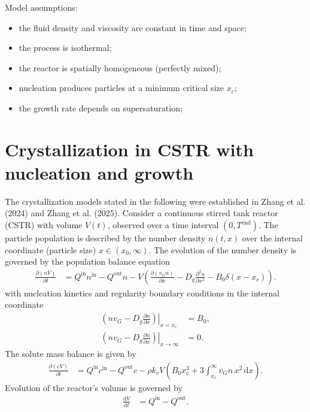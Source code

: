 \documentclass{article}
\begin{document}
Model assumptions:
\begin{itemize}
    \item the fluid density and viscosity are constant in time and space;
    \item the process is isothermal;
    \item the reactor is spatially homogeneous (perfectly mixed);
    \item nucleation produces particles at a minimum critical size $x_{c}$;
    \item the growth rate depends on supersaturation;
\end{itemize}

\section*{Crystallization in CSTR with nucleation and growth}
The crystallization models stated in the following were established in Zhang et al. (2024) and Zhang et al. (2025).
Consider a continuous stirred tank reactor (CSTR) with volume $V(t)$, observed over a time interval $(0, T^{\mathrm{end}})$.
The particle population is described by the number density $n(t, x)$ over the internal coordinate (particle size) $x\in(x_{0}, \infty)$.
The evolution of the number density is governed by the population balance equation
\begin{align}
    \frac{\partial (n V)}{\partial t}
    &= Q^{\mathrm{in}} n^{\mathrm{in}}
        - Q^{\mathrm{out}} n
        - V \left( \frac{\partial (v_{G} n)}{\partial x} - D_{g} \frac{\partial^{2} n}{\partial x^{2}} - B_{0} \delta(x - x_{c}) \right).
\end{align}
with nucleation kinetics and regularity boundary conditions in the internal coordinate
\begin{align}
    \left. \left( n v_{G} - D_{g} \frac{\partial n}{\partial x} \right) \right|_{x = x_{c}}
    &= B_{0},
    \\
    \left. \left( n v_{G} - D_{g} \frac{\partial n}{\partial x} \right) \right|_{x \to \infty}
    &= 0.
\end{align}
The solute mass balance is given by
\begin{align}
    \frac{\partial (c V)}{\partial t}
    &= Q^{\mathrm{in}} c^{\mathrm{in}}
        - Q^{\mathrm{out}} c
        - \rho k_{v} V \left( B_{0} x_{c}^{3} + 3 \int_{x_{c}}^{\infty} v_{G} n \, x^{2} \, \mathrm{d}x \right).
\end{align}
Evolution of the reactor’s volume is governed by
\begin{align}
    \frac{\mathrm{d} V}{\mathrm{d} t}
    &= Q^{\mathrm{in}}
        - Q^{\mathrm{out}}.
\end{align}
\end{document}
